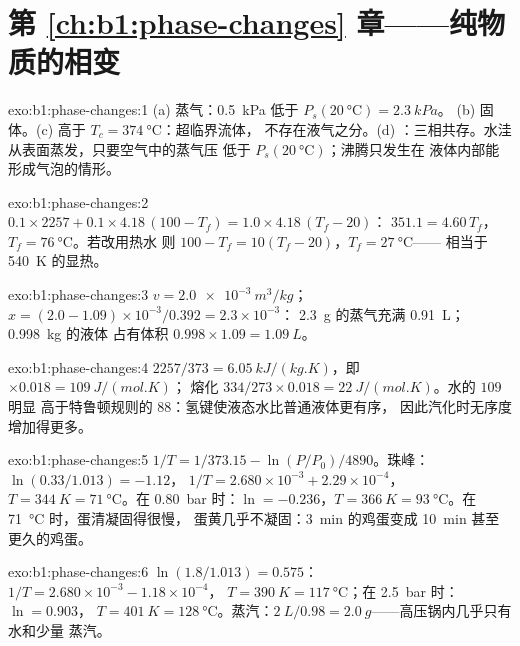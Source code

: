 \section*{第 \ref{ch:b1:phase-changes} 章——纯物质的相变}

\begin{solution}{exo:b1:phase-changes:1}
(a) 蒸气：\qty{0.5}{kPa} 低于 $P_s(\qty{20}{\degreeCelsius}) = \qty{2.3}{kPa}$。
(b) 固体。(c) 高于 $T_c = \qty{374}{\degreeCelsius}$：超临界流体，
不存在液气之分。(d) ：三相共存。水洼
从表面蒸发，只要空气中的蒸气压
低于 $P_s(\qty{20}{\degreeCelsius})$；沸腾只发生在
液体内部能形成气泡的情形。
\end{solution}

\begin{solution}{exo:b1:phase-changes:2}
$0.1 \times 2257 + 0.1 \times 4.18\,(100 - T_f) = 1.0 \times 4.18\,(T_f - 20)$：
$351.1 = 4.60\,T_f$，$T_f = \qty{76}{\degreeCelsius}$。若改用热水
则 $100 - T_f = 10(T_f - 20)$，$T_f = \qty{27}{\degreeCelsius}$——
相当于 \qty{540}{K} 的显热。
\end{solution}

\begin{solution}{exo:b1:phase-changes:3}
$v = \qty{2.0e-3}{m^3/kg}$；$x = (2.0 - 1.09) \times 10^{-3}/0.392 = 2.3 \times 10^{-3}$：
\qty{2.3}{g} 的蒸气充满 \qty{0.91}{L}；\qty{0.998}{kg} 的液体
占有体积 $0.998 \times 1.09 = \qty{1.09}{L}$。
\end{solution}

\begin{solution}{exo:b1:phase-changes:4}
$2257/373 = \qty{6.05}{kJ/(kg.K)}$，即 $\times 0.018 = \qty{109}{J/(mol.K)}$；
熔化 $334/273 \times 0.018 = \qty{22}{J/(mol.K)}$。水的 $109$ 明显
高于特鲁顿规则的 $88$：氢键使液态水比普通液体更有序，
因此汽化时无序度增加得更多。
\end{solution}

\begin{solution}{exo:b1:phase-changes:5}
$1/T = 1/373.15 - \ln(P/P_0)/4890$。珠峰：$\ln(0.33/1.013) = -1.12$，
$1/T = 2.680 \times 10^{-3} + 2.29 \times 10^{-4}$，$T = \qty{344}{K} =
\qty{71}{\degreeCelsius}$。在 \qty{0.80}{bar} 时：$\ln = -0.236$，$T = \qty{366}{K} =
\qty{93}{\degreeCelsius}$。在 \qty{71}{\degreeCelsius} 时，蛋清凝固得很慢，
蛋黄几乎不凝固：\qty{3}{min} 的鸡蛋变成
\qty{10}{min} 甚至更久的鸡蛋。
\end{solution}

\begin{solution}{exo:b1:phase-changes:6}
$\ln(1.8/1.013) = 0.575$：$1/T = 2.680 \times 10^{-3} - 1.18 \times 10^{-4}$，
$T = \qty{390}{K} = \qty{117}{\degreeCelsius}$；在 \qty{2.5}{bar} 时：$\ln = 0.903$，
$T = \qty{401}{K} = \qty{128}{\degreeCelsius}$。蒸汽：$\qty{2}{L}/0.98 =
\qty{2.0}{g}$——高压锅内几乎只有水和少量
蒸汽。
\end{solution}

